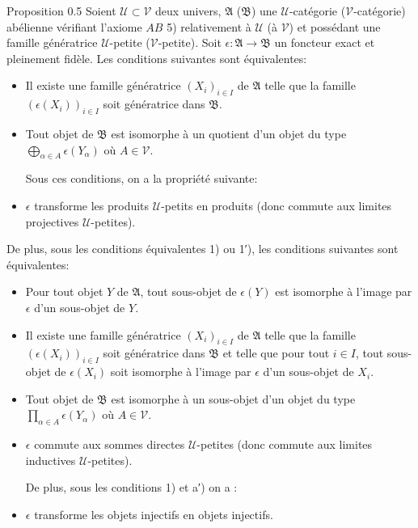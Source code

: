 \documentclass[10pt]{../fichiers-configuration-latex/smfart}
\begin{document}
\begin{enonce*}{Proposition 0.5}
Soient $𝒰 \subset 𝒱$ deux univers, $\mathfrak{A}$
(\resp $\mathfrak{B}$) une $𝒰$-catégorie (\resp $𝒱$-catégorie)
abélienne vérifiant l'axiome $AB$ 5) relativement à $𝒰$
(\resp à $𝒱$) et possédant une famille génératrice $𝒰$-petite
(\resp $𝒱$-petite). Soit $\epsilon : \mathfrak{A} \to \mathfrak{B}$
un foncteur exact et pleinement fidèle. Les conditions suivantes
sont équivalentes:
\begin{itemize}
\item[1)] Il existe une famille génératrice $(X_i)_{i\in I}$ de
  $\mathfrak{A}$ telle que la famille $(\epsilon(X_i))_{i\in I}$
  soit génératrice dans $\mathfrak{B}$.

\item[1′)] Tout objet de $\mathfrak{B}$ est isomorphe à un quotient
  d'un objet du type $\displaystyle{⨁_{\alpha \in A}} \epsilon
  (Y_\alpha)$ où $A \in 𝒱$.

   Sous ces conditions, on a la propriété suivante:

\item [2)] $\epsilon$ transforme les produits $𝒰$-petits en
  produits (donc commute aux limites projectives $𝒰$-petites).
\end{itemize}

De plus, sous les conditions équivalentes 1) ou 1′), les conditions
suivantes sont équivalentes\pageoriginale:
\begin{itemize}
\item[a)] Pour tout objet $Y$ de $\mathfrak{A}$, tout sous-objet de
  $\epsilon(Y)$ est isomorphe à l'image par $\epsilon$ d'un
  sous-objet de $Y$.

\item[a′)] Il existe une famille génératrice $(X_i)_{i \in I}$ de
  $\mathfrak{A}$ telle que la famille $(\epsilon(X_i))_{i \in I}$
  soit génératrice dans $\mathfrak{B}$ et telle que pour tout $i
  \in I$, tout sous-objet de $\epsilon(X_i)$ soit isomorphe à
  l'image par $\epsilon$ d'un sous-objet de $X_i$.

\item[b)] Tout objet de $\mathfrak{B}$ est isomorphe à un sous-objet d'un
  objet du type $\prod_{\alpha \in A} \epsilon(Y_\alpha)$ où
  $A \in 𝒱$.

\item[c)] $\epsilon$ commute aux sommes directes $𝒰$-petites (donc
  commute aux limites inductives $𝒰$-petites).

De plus, sous les conditions 1) et a′) on a :

\item[d)] $\epsilon$ transforme les objets injectifs en objets injectifs.
\end{itemize}
\end{enonce*}
\end{document}
